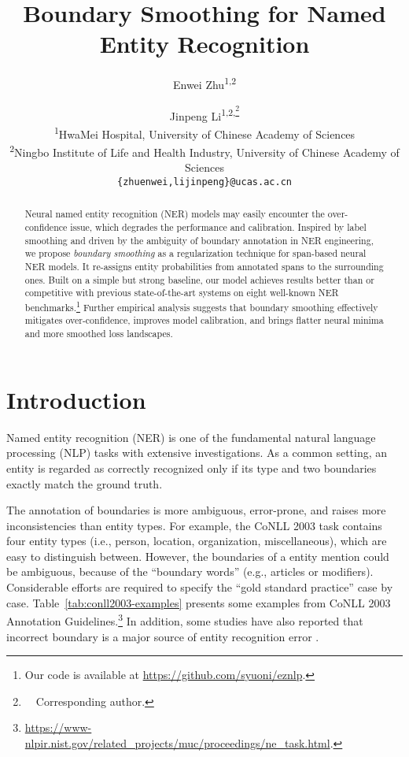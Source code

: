 \documentclass[11pt]{article}
\title{Boundary Smoothing for Named Entity Recognition}
\author{Enwei Zhu\textsuperscript{\rm 1,2} \and Jinpeng Li\textsuperscript{\rm 1,2,\thanks{~~Corresponding author.}}  \\
        \textsuperscript{\rm 1}HwaMei Hospital, University of Chinese Academy of Sciences \\
        \textsuperscript{\rm 2}Ningbo Institute of Life and Health Industry, University of Chinese Academy of Sciences \\ 
    	\texttt{\{zhuenwei,lijinpeng\}@ucas.ac.cn}}
\begin{document}
\maketitle
\begin{abstract}
Neural named entity recognition (NER) models may easily encounter the over-confidence issue, which degrades the performance and calibration. Inspired by label smoothing and driven by the ambiguity of boundary annotation in NER engineering, we propose \emph{boundary smoothing} as a regularization technique for span-based neural NER models. It re-assigns entity probabilities from annotated spans to the surrounding ones. Built on a simple but strong baseline, our model achieves results better than or competitive with previous state-of-the-art systems on eight well-known NER benchmarks.\footnote{Our code is available at \url{https://github.com/syuoni/eznlp}.} Further empirical analysis suggests that boundary smoothing effectively mitigates over-confidence, improves model calibration, and brings flatter neural minima and more smoothed loss landscapes. 
\end{abstract}

\section{Introduction} \label{sec:intro}
Named entity recognition (NER) is one of the fundamental natural language processing (NLP) tasks with extensive investigations. As a common setting, an entity is regarded as correctly recognized only if its type and two boundaries exactly match the ground truth. 

The annotation of boundaries is more ambiguous, error-prone, and raises more inconsistencies than entity types. For example, the CoNLL 2003 task contains four entity types (i.e., person, location, organization, miscellaneous), which are easy to distinguish between. However, the boundaries of a entity mention could be ambiguous, because of the ``boundary words'' (e.g., articles or modifiers). Considerable efforts are required to specify the ``gold standard practice'' case by case. Table~\ref{tab:conll2003-examples} presents some examples from CoNLL 2003 Annotation Guidelines.\footnote{\url{https://www-nlpir.nist.gov/related_projects/muc/proceedings/ne_task.html}.} In addition, some studies have also reported that incorrect boundary is a major source of entity recognition error \citep{wang-etal-2019-crossweigh,eberts2019span}. 
\end{document}
